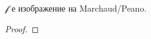 \begin{proposition}
  \label{prop:Marchaud-Peano}
  $\mathscr{f}$ е изображение на Marchaud/Peano.
\end{proposition}


\begin{proof}


\end{proof}
